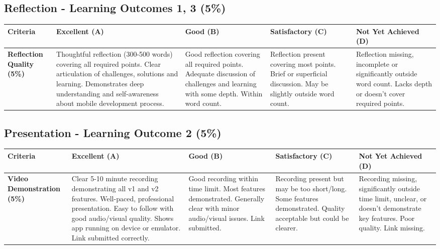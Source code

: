 \documentclass{article}
\begin{document}
\begin{landscape}
\begin{tabular}{|p{5cm}|p{4cm}|p{4cm}|p{4cm}|p{4cm}|}
\end{tabular}

\subsection*{Reflection - Learning Outcomes 1, 3 (5\%)}

\begin{tabular}{|p{5cm}|p{4cm}|p{4cm}|p{4cm}|p{4cm}|}
\hline
\textbf{Criteria} & \textbf{Excellent (A)} & \textbf{Good (B)} & \textbf{Satisfactory (C)} & \textbf{Not Yet Achieved (D)} \\ \hline

\textbf{Reflection Quality (5\%)} & 
Thoughtful reflection (300-500 words) covering all required points. Clear articulation of challenges, solutions and learning. Demonstrates deep understanding and self-awareness about mobile development process. & 
Good reflection covering all required points. Adequate discussion of challenges and learning with some depth. Within word count. & 
Reflection present covering most points. Brief or superficial discussion. May be slightly outside word count. & 
Reflection missing, incomplete or significantly outside word count. Lacks depth or doesn't cover required points. \\ \hline

\end{tabular}

\subsection*{Presentation - Learning Outcome 2 (5\%)}

\begin{tabular}{|p{5cm}|p{4cm}|p{4cm}|p{4cm}|p{4cm}|}
\hline
\textbf{Criteria} & \textbf{Excellent (A)} & \textbf{Good (B)} & \textbf{Satisfactory (C)} & \textbf{Not Yet Achieved (D)} \\ \hline

\textbf{Video Demonstration (5\%)} & 
Clear 5-10 minute recording demonstrating all v1 and v2 features. Well-paced, professional presentation. Easy to follow with good audio/visual quality. Shows app running on device or emulator. Link submitted correctly. & 
Good recording within time limit. Most features demonstrated. Generally clear with minor audio/visual issues. Link submitted. & 
Recording present but may be too short/long. Some features demonstrated. Quality acceptable but could be clearer. & 
Recording missing, significantly outside time limit, unclear, or doesn't demonstrate key features. Poor quality. Link missing. \\ \hline

\end{tabular}

\restoregeometry
\end{landscape}
\end{document}
